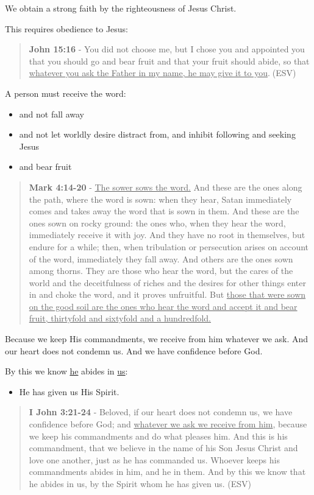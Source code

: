 \documentclass[11pt]{article}
\begin{document}
We obtain a strong faith by the righteousness of Jesus Christ.

This requires obedience to Jesus:

\begin{quote}
\textbf{John 15:16} - You did not choose me, but I chose you and appointed you that you should go and bear fruit and that your fruit should abide, so that \uline{whatever you ask the Father in my name, he may give it to you}.􀀂(ESV)
\end{quote}

A person must receive the word:
\begin{itemize}
\item and not fall away
\item and not let worldly desire distract from, and inhibit following and seeking Jesus
\item and bear fruit
\end{itemize}

\begin{quote}
\textbf{Mark 4:14-20} - \uline{The sower sows the word.} And these are the ones along the path, where the word is sown: when they hear, Satan immediately comes and takes away the word that is sown in them. And these are the ones sown on rocky ground: the ones who, when they hear the word, immediately receive it with joy. And they have no root in themselves, but endure for a while; then, when tribulation or persecution arises on account of the word, immediately they fall away. And others are the ones sown among thorns. They are those who hear the word, but the cares of the world and the deceitfulness of riches and the desires for other things enter in and choke the word, and it proves unfruitful. But \uline{those that were sown on the good soil are the ones who hear the word and accept it and bear fruit, thirtyfold and sixtyfold and a hundredfold.}
\end{quote}

Because we keep His commandments, we receive from him whatever we ask.
And our heart does not condemn us.
And we have confidence before God.

By this we know \uline{he} abides in \uline{us}:
\begin{itemize}
\item He has given us His Spirit.
\end{itemize}

\begin{quote}
\textbf{I John 3:21-24} - Beloved, if our heart does not condemn us, we have confidence before God; and \uline{whatever we ask we receive from him}, because we keep his commandments and do what pleases him. And this is his commandment, that we believe in the name of his Son Jesus Christ and love one another, just as he has commanded us. Whoever keeps his commandments abides in him, and he in them. And by this we know that he abides in us, by the Spirit whom he has given us. (ESV)
\end{quote}
\end{document}

